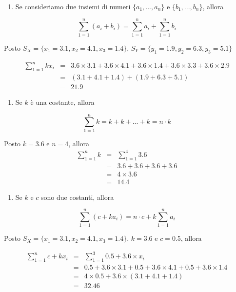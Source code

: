 \documentclass[
  11pt,
]{book}
\providecommand{\tightlist}{%
  \setlength{\itemsep}{0pt}\setlength{\parskip}{0pt}}
\theoremstyle{mytheoremstyle}
\theoremstyle{mydefstyle}
\begin{document}
\begin{enumerate}
\def\labelenumi{\arabic{enumi}.}
\setcounter{enumi}{1}
\tightlist
\item
  Se consideriamo due insiemi di numeri \(\{a_1,...,a_n\}\) e \(\{b_1,...,b_n\}\), allora
\end{enumerate}

\[
\sum_{1=1}^n (a_i + b_i) = \sum_{1=1}^n  a_i + \sum_{1=1}^n  b_i
\]

Posto \(S_X=\{x_1 = 3.1,x_2 = 4.1, x_3 = 1.4\}\),
\(S_Y=\{y_1 = 1.9,y_2 = 6.3, y_3 = 5.1\}\)

\begin{eqnarray*}
\sum_{1=1}^n k x_i   &=&  3.6\times 3.1+3.6\times 4.1+3.6\times 1.4+3.6\times 3.3+3.6\times 2.9\\
 &=& ( 3.1+4.1+1.4 ) + ( 1.9+6.3+5.1 )\\
 &=& 21.9
\end{eqnarray*}

\begin{enumerate}
\def\labelenumi{\arabic{enumi}.}
\setcounter{enumi}{2}
\tightlist
\item
  Se \(k\) è una costante, allora
\end{enumerate}

\[
\sum_{1=1}^nk=k+k+...+k=n\cdot k
\]

Posto \(k=3.6\) e \(n=4\), allora
\begin{eqnarray*}
\sum_{1=1}^n  k   &=&  \sum_{1=1}^4 3.6\\
 &=& 3.6+3.6+3.6+3.6\\
 &=& 4\times 3.6\\
 &=& 14.4
\end{eqnarray*}

\begin{enumerate}
\def\labelenumi{\arabic{enumi}.}
\setcounter{enumi}{3}
\tightlist
\item
  Se \(k\) e \(c\) sono due costanti, allora
\end{enumerate}

\[
\sum_{1=1}^n(c+ k a_i) = n\cdot c+k\sum_{1=1}^n  a_i
\]

Posto \(S_X=\{x_1 = 3.1,x_2 = 4.1, x_3 = 1.4\}\), \(k=3.6\) e \(c=0.5\), allora

\begin{eqnarray*}
\sum_{1=1}^n c + k x_i   &=&  \sum_{1=1}^3 0.5 + 3.6\times x_i  \\
 &=& 0.5 + 3.6 \times 3.1+0.5 + 3.6 \times 4.1+0.5 + 3.6 \times 1.4\\
 &=& 4\times 0.5 + 3.6 \times (3.1+4.1+1.4)\\
 &=& 32.46
\end{eqnarray*}
\end{document}
